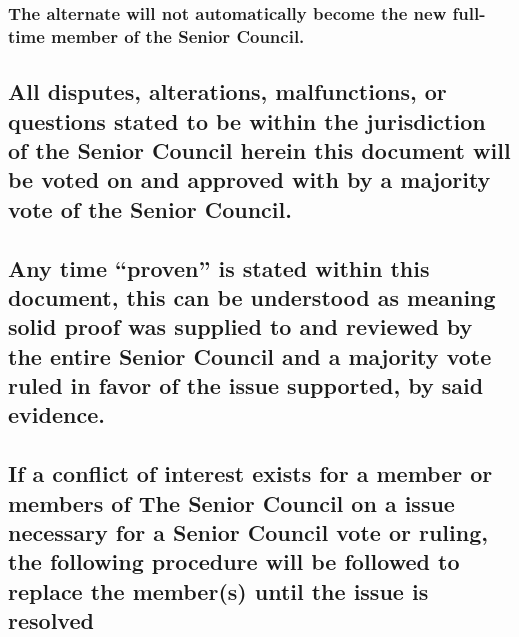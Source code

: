 \documentclass[
]{book}
\begin{document}
\hypertarget{the-alternate-will-not-automatically-become-the-new-full-time-member-of-the-senior-council.}{%
\subsubsection{The alternate will not automatically become the new full-time member of the Senior Council.}\label{the-alternate-will-not-automatically-become-the-new-full-time-member-of-the-senior-council.}}

\hypertarget{all-disputes-alterations-malfunctions-or-questions-stated-to-be-within-the-jurisdiction-of-the-senior-council-herein-this-document-will-be-voted-on-and-approved-with-by-a-majority-vote-of-the-senior-council.}{%
\subsection{All disputes, alterations, malfunctions, or questions stated to be within the jurisdiction of the Senior Council herein this document will be voted on and approved with by a majority vote of the Senior Council.}\label{all-disputes-alterations-malfunctions-or-questions-stated-to-be-within-the-jurisdiction-of-the-senior-council-herein-this-document-will-be-voted-on-and-approved-with-by-a-majority-vote-of-the-senior-council.}}

\hypertarget{any-time-proven-is-stated-within-this-document-this-can-be-understood-as-meaning-solid-proof-was-supplied-to-and-reviewed-by-the-entire-senior-council-and-a-majority-vote-ruled-in-favor-of-the-issue-supported-by-said-evidence.}{%
\subsection{Any time ``proven'' is stated within this document, this can be understood as meaning solid proof was supplied to and reviewed by the entire Senior Council and a majority vote ruled in favor of the issue supported, by said evidence.}\label{any-time-proven-is-stated-within-this-document-this-can-be-understood-as-meaning-solid-proof-was-supplied-to-and-reviewed-by-the-entire-senior-council-and-a-majority-vote-ruled-in-favor-of-the-issue-supported-by-said-evidence.}}

\hypertarget{if-a-conflict-of-interest-exists-for-a-member-or-members-of-the-senior-council-on-a-issue-necessary-for-a-senior-council-vote-or-ruling-the-following-procedure-will-be-followed-to-replace-the-members-until-the-issue-is-resolved}{%
\subsection{If a conflict of interest exists for a member or members of The Senior Council on a issue necessary for a Senior Council vote or ruling, the following procedure will be followed to replace the member(s) until the issue is resolved}\label{if-a-conflict-of-interest-exists-for-a-member-or-members-of-the-senior-council-on-a-issue-necessary-for-a-senior-council-vote-or-ruling-the-following-procedure-will-be-followed-to-replace-the-members-until-the-issue-is-resolved}}
\end{document}
